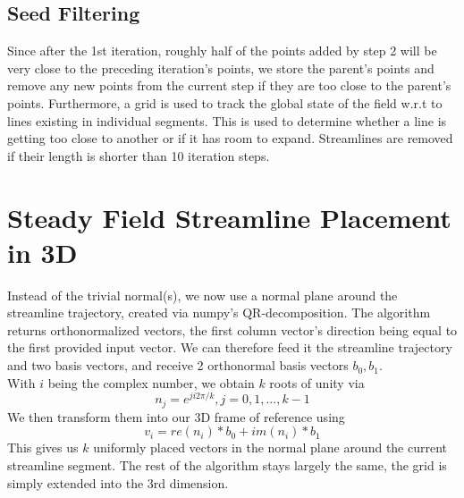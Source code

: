 \subsection{Seed Filtering}
Since after the 1st iteration, roughly half of the points added by step 2 will be very close to the preceding iteration's points, we store the parent's points and remove any new points from the current step if they are too close to the parent's points.
Furthermore, a grid is used to track the global state of the field w.r.t to lines existing in individual segments.
This is used to determine whether a line is getting too close to another or if it has room to expand. Streamlines are removed if their length is shorter than 10 iteration steps.
\section{Steady Field Streamline Placement in 3D}
Instead of the trivial normal(s), we now use a normal plane around the streamline trajectory, created via numpy's QR-decomposition. The algorithm returns orthonormalized vectors, the first column vector's direction being equal to the first provided input vector.
We can therefore feed it the streamline trajectory and two basis vectors, and receive 2 orthonormal basis vectors $b_0, b_1$.\\
With $i$ being the complex number, we obtain $k$ roots of unity via \[n_j = e^{ji2\pi/k}, j = 0, 1, ..., k-1\]
We then transform them into our 3D frame of reference using \[v_i = re(n_i)*b_0 + im(n_i)*b_1 \] This gives us $k$ uniformly placed  vectors in the normal plane around the current streamline segment. The rest of the algorithm stays largely the same, the grid is simply extended into the 3rd dimension.
\newpage
